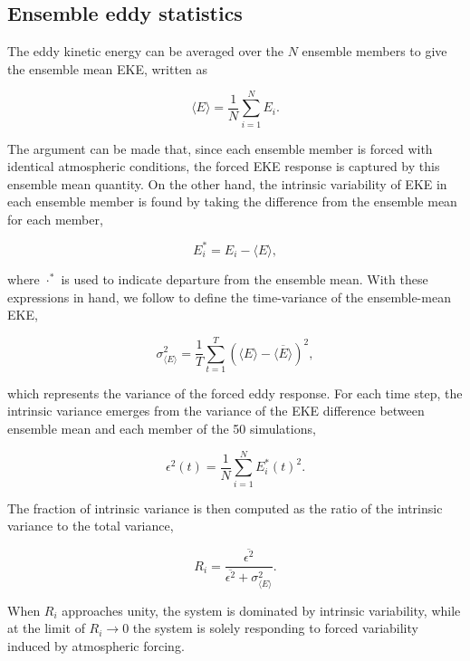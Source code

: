 \documentclass[linenumbers]{agujournal2019}
\begin{document}
\subsection{Ensemble eddy statistics}

The eddy kinetic energy can be averaged over the $N$ ensemble members to give the ensemble mean EKE, written as
\begin{linenomath*}
\begin{equation}
\langle E \rangle = \frac{1}{N} \sum_{i=1}^N E_i.
\end{equation}
\end{linenomath*}
The argument can be made that, since each ensemble member is forced with identical atmospheric conditions, the forced EKE response is captured by this ensemble mean quantity.
On the other hand, the intrinsic variability of EKE in each ensemble member is found by taking the difference from the ensemble mean for each member,
\begin{linenomath*}
\begin{equation}
E_i^* = E_i - \langle E \rangle,
\end{equation}
\end{linenomath*}
where $\cdot^*$ is used to indicate departure from the ensemble mean.
With these expressions in hand, we follow \citet{Leroux2018} to define the  time-variance of the ensemble-mean EKE,
\begin{linenomath*}
\begin{equation}
\sigma^2_{\langle E \rangle} = \frac{1}{T} \sum_{t=1}^T \left(\langle E \rangle -  \overline{\langle E \rangle}\right)^2,
\end{equation}
\end{linenomath*}
which represents the variance of the forced eddy response.
For each time step, the intrinsic variance emerges from the variance of the EKE difference between ensemble mean and each member of the 50 simulations,
\begin{linenomath*}
\begin{equation}
\epsilon^2(t) = \frac{1}{N} \sum_{i=1}^N E_i^*(t)^2.
\end{equation}
\end{linenomath*}
The fraction of intrinsic variance is then computed as the ratio of the intrinsic variance to the total variance,
\begin{linenomath*}
\begin{equation}
R_i =  \frac{\overline{\epsilon^2}}{\overline{\epsilon^2} + \sigma^2_{\langle E \rangle}}.
\end{equation}
\end{linenomath*}
When $R_i$ approaches unity, the system is dominated by intrinsic variability, while at the limit  of $R_i \to 0$ the system is solely responding to forced variability induced by atmospheric forcing.
\end{document}
